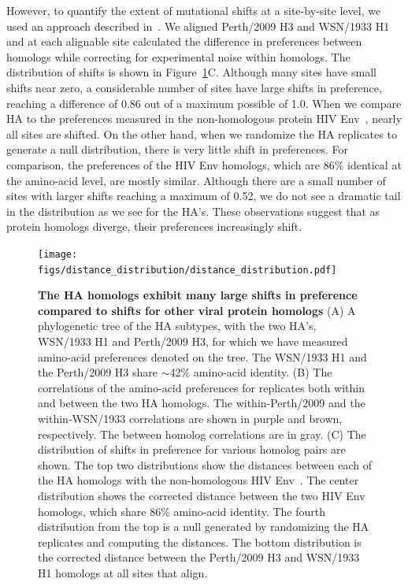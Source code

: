 \documentclass[9pt,twocolumn,twoside]{pnas-new}
\begin{document}
However, to quantify the extent of mutational shifts at a site-by-site level, we used an approach described in~\cite{doud2015site,haddox2017mapping}.
We aligned Perth/2009 H3 and WSN/1933 H1 and at each alignable site calculated the difference in preferences between homologs while correcting for experimental noise within homologs.
The distribution of shifts is shown in Figure~\ref{fig:distance_distribution}C.
Although many sites have small shifts near zero, a considerable number of sites have large shifts in preference, reaching a difference of 0.86 out of a maximum possible of 1.0.
When we compare HA to the preferences measured in the non-homologous protein HIV Env~\cite{haddox2017mapping}, nearly all sites are shifted.
On the other hand, when we randomize the HA replicates to generate a null distribution, there is very little shift in preferences. 
For comparison, the preferences of the HIV Env homologs, which are 86\% identical at the amino-acid level, are mostly similar. 
Although there are a small number of sites with larger shifts reaching a maximum of 0.52, we do not see a dramatic tail in the distribution as we see for the HA's.
These observations suggest that as protein homologs diverge, their preferences increasingly shift.

\begin{figure}
\centering
\texttt{[image: figs/distance\_distribution/distance\_distribution.pdf]}
\caption{\label{fig:distance_distribution}
{\bf The HA homologs exhibit many large shifts in preference compared to shifts for other viral protein homologs}
(A) A phylogenetic tree of the HA subtypes, with the two HA's, WSN/1933 H1 and Perth/2009 H3, for which we have measured amino-acid preferences denoted on the tree. 
The WSN/1933 H1 and the Perth/2009 H3 share $\sim$42\% amino-acid identity.
(B) The correlations of the amino-acid preferences for replicates both within and between the two HA homologs. 
The within-Perth/2009 and the within-WSN/1933 correlations are shown in purple and brown, respectively.
The between homolog correlations are in gray.
(C) The distribution of shifts in preference for various homolog pairs are shown.
The top two distributions show the distances between each of the HA homologs with the non-homologous HIV Env~\cite{haddox2017mapping}. %
The center distribution shows the corrected distance between the two HIV Env homologs, which share 86\% amino-acid identity.
The fourth distribution from the top is a null generated by randomizing the HA replicates and computing the distances.
The bottom distribution is the corrected distance between the Perth/2009 H3 and WSN/1933 H1 homologs at all sites that align.
}
\end{figure}
\end{document}
